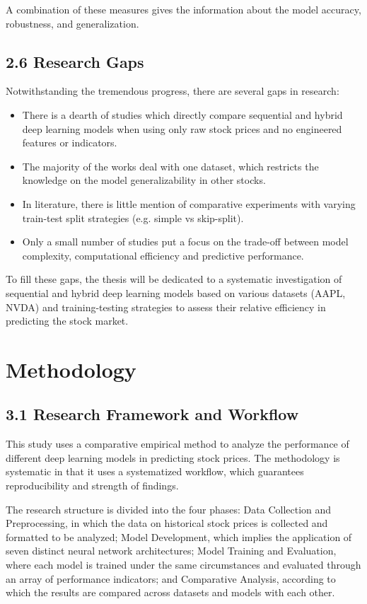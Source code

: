 \documentclass[12pt,a4paper]{report}
\begin{document}
A combination of these measures gives the information about the model accuracy, robustness, and generalization.

\section{2.6 Research Gaps}
Notwithstanding the tremendous progress, there are several gaps in research:

\begin{itemize}
  \item There is a dearth of studies which directly compare sequential and hybrid deep learning models when using only raw stock prices and no engineered features or indicators.
  \item The majority of the works deal with one dataset, which restricts the knowledge on the model generalizability in other stocks. 
  \item In literature, there is little mention of comparative experiments with varying train-test split strategies (e.g. simple vs skip-split). 
  \item Only a small number of studies put a focus on the trade-off between model complexity, computational efficiency and predictive performance. 
\end{itemize}

To fill these gaps, the thesis will be dedicated to a systematic investigation of sequential and hybrid deep learning models based on various datasets (AAPL, NVDA) and training-testing strategies to assess their relative efficiency in predicting the stock market.

\chapter{Methodology}
\label{ch:3}
\section{3.1 Research Framework and Workflow}
This study uses a comparative empirical method to analyze the performance of different deep learning models in predicting stock prices. The methodology is systematic in that it uses a systematized workflow, which guarantees reproducibility and strength of findings.

The research structure is divided into the four phases: Data Collection and Preprocessing, in which the data on historical stock prices is collected and formatted to be analyzed;  Model Development, which implies the application of seven distinct neural network architectures; Model Training and Evaluation, where each model is trained under the same circumstances and evaluated through an array of performance indicators; and Comparative Analysis, according to which the results are compared across datasets and models with each other.
\end{document}
